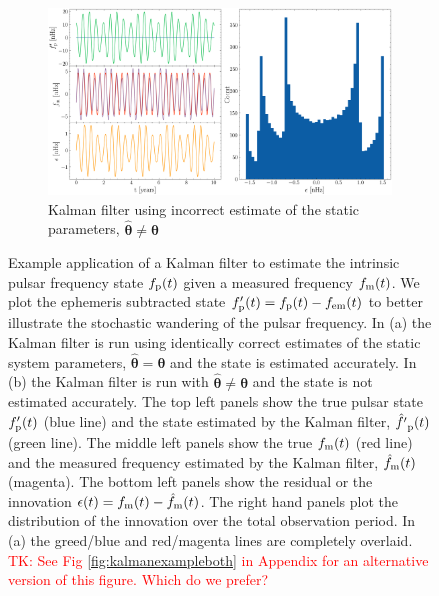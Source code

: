 \documentclass[fleqn,usenatbib,useAMS]{mnras}
\begin{document}
\begin{figure}
	\begin{subfigure}[b]{1\textwidth}
		\includegraphics[width=\textwidth]{images/Kalman_example_wrong_params}
		\caption{Kalman filter using incorrect estimate of the static parameters, $\hat{\boldsymbol{\theta}} \neq \boldsymbol{\theta}$}
		\label{fig:25MB_bfs}
	\end{subfigure}
	\caption{Example application of a Kalman filter to estimate the intrinsic pulsar frequency state $f_{\rm p}(t)$ given a measured frequency $f_{\rm m}(t)$. We plot the ephemeris subtracted state $f'_{\rm p}(t) = f_{\rm p}(t) - f_{\rm em} (t)$ to better illustrate the stochastic wandering of the pulsar frequency. In (a) the Kalman filter is run using identically correct estimates of the static system parameters, $\hat{\boldsymbol{\theta}} = \boldsymbol{\theta}$ and the state is estimated accurately. In (b) the Kalman filter is run with $\hat{\boldsymbol{\theta}} \neq \boldsymbol{\theta}$ and the state is not estimated accurately. The top left panels show the true pulsar state $f'_{\rm p}(t)$ (blue line) and the state estimated by the Kalman filter, $\hat{f'}_{\rm p}(t)$ (green line). The middle left panels show the true $f_{\rm m}(t)$ (red line) and the measured frequency estimated  by the Kalman filter, $\hat{f}_{\rm m}(t)$ (magenta). The bottom left panels show the residual or the innovation $\epsilon(t) =f_{\rm m}(t) - \hat{f}_{\rm m}(t)$. The right hand panels plot the distribution of the innovation over the total observation period. In (a) the greed/blue and red/magenta lines are completely overlaid.  \textcolor{red}{TK: See Fig \ref{fig:kalmanexampleboth} in Appendix for an alternative version of this figure. Which do we prefer?}}
	\label{fig:four figures}
\end{figure}
\end{document}
